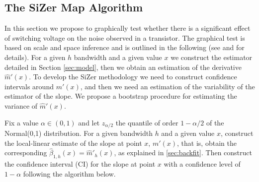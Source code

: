 \documentclass[sn-mathphys]{sn-jnl}%
\theoremstyle{thmstyleone}%
\theoremstyle{thmstyletwo}%
\theoremstyle{thmstylethree}%
\begin{document}
\subsection{The SiZer Map Algorithm}
In this section we propose to graphically test whether there is a significant effect of switching voltage on the noise observed in a transistor. The graphical test is based on scale and space inference and is outlined in the following (see \cite{CM1999} and  \cite{GNR2020} for details). For a given $h$ bandwidth and a given value $x$ we construct the estimator detailed in Section \ref{sec:model}, then we obtain an estimation of the derivative $\widehat{m}'(x)$. To develop the SiZer methodology we need to construct confidence intervals around $m'(x)$, and then we need an estimation of the variability of the estimator of the slope. We propose a bootstrap procedure for estimating the variance of $\widehat{m}'(x)$. \

Fix a value $\alpha \in (0,1)$ and let $z_{\alpha/2}$ the quantile of order $1-\alpha/2$ of the Normal(0,1) distribution. For a given bandwidth $h$ and a given value $x$, construct the local-linear estimate of the slope at point $x$, $m'(x)$, that is, obtain the corresponding $\widehat{\beta}_{1,h}(x)=\widehat{m}'_h(x)$, as explained in \ref{sec:backfit}. Then construct the confidence interval (CI) for the slope at point $x$ with a confidence level of $1-\alpha$ following the algorithm below.
\end{document}
